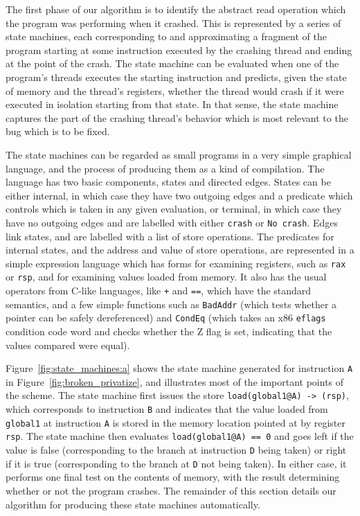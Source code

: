 \documentclass[10pt,letter,twocolumn]{sigplanconf}
\begin{document}
The first phase of our algorithm is to identify the abstract read
operation which the program was performing when it crashed.  This is
represented by a series of state machines, each corresponding to and
approximating a fragment of the program starting at some instruction
executed by the crashing thread and ending at the point of the crash.
The state machine can be evaluated when one of the program's threads
executes the starting instruction and predicts, given the state of
memory and the thread's registers, whether the thread would crash if
it were executed in isolation starting from that state.  In that
sense, the state machine captures the part of the crashing thread's
behavior which is most relevant to the bug which is to be fixed.

The state machines can be regarded as small programs in a very simple
graphical language, and the process of producing them as a kind of
compilation.  The language has two basic components, states and
directed edges.  States can be either internal, in which case they
have two outgoing edges and a predicate which controls which is taken
in any given evaluation, or terminal, in which case they have no
outgoing edges and are labelled with either \verb|crash| or
\verb|No crash|.  Edges link states, and are labelled with a list of
store operations.  The predicates for internal states, and the address
and value of store operations, are represented in a simple expression
language which has forms for examining registers, such as \verb|rax|
or \verb|rsp|, and for examining values loaded from memory.  It also
has the usual operators from C-like languages, like \verb|+| and
\verb|==|, which have the standard semantics, and a few simple
functions such as \verb|BadAddr| (which tests whether a pointer can be
safely dereferenced) and \verb|CondEq| (which takes an x86
\verb|eflags| condition code word and checks whether the Z flag is
set, indicating that the values compared were equal).

Figure~\ref{fig:state_machines:a} shows the state machine generated
for instruction \verb|A| in Figure~\ref{fig:broken_privatize}, and
illustrates most of the important points of the scheme.  The state
machine first issues the store \verb|load(global1@A) -> (rsp)|, which
corresponds to instruction \verb|B| and indicates that the value
loaded from \verb|global1| at instruction \verb|A| is stored in the
memory location pointed at by register \verb|rsp|.  The state machine
then evaluates \verb|load(global1@A) == 0| and goes left if the value
is false (corresponding to the branch at instruction \verb|D| being
taken) or right if it is true (corresponding to the branch at \verb|D|
not being taken).  In either case, it performs one final test on the
contents of memory, with the result determining whether or not the
program crashes.  The remainder of this section details our algorithm
for producing these state machines automatically.
\end{document}
